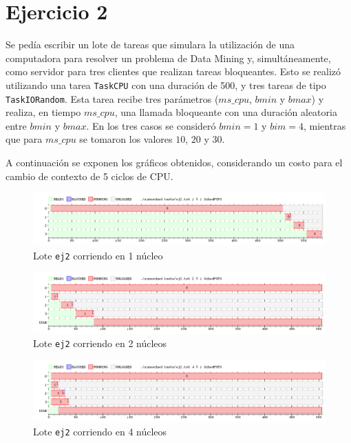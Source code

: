 \section{Ejercicio 2}

Se pedía escribir un lote de tareas que simulara la utilización de una
computadora para resolver un problema de Data Mining y, simultáneamente, como
servidor para tres clientes que realizan tareas bloqueantes. Esto se realizó
utilizando una tarea \texttt{TaskCPU} con una duración de 500, y tres tareas de
tipo \texttt{TaskIORandom}. Esta tarea recibe tres parámetros ($ms\_cpu$, $bmin$
y $bmax$) y realiza, en tiempo $ms\_cpu$, una llamada bloqueante con una duración
aleatoria entre $bmin$ y $bmax$. En los tres casos se consideró $bmin = 1$ y
$bim = 4$, mientras que para $ms\_cpu$ se tomaron los valores $10$, $20$ y $30$.

A continuación se exponen los gráficos obtenidos, considerando un costo para el cambio de contexto de 5 ciclos de CPU.

\begin{figure}[H]
    \begin{center}
        \includegraphics[width=1\columnwidth]{imagenes/ej2_1.png}
        \caption{Lote \texttt{ej2} corriendo en 1 núcleo}
    \end{center}
\end{figure}

\begin{figure}[H]
    \begin{center}
        \includegraphics[width=1\columnwidth]{imagenes/ej2_2.png}
        \caption{Lote \texttt{ej2} corriendo en 2 núcleos}
    \end{center}
\end{figure}

\begin{figure}[H]
    \begin{center}
        \includegraphics[width=1\columnwidth]{imagenes/ej2_3.png}
        \caption{Lote \texttt{ej2} corriendo en 4 núcleos}
    \end{center}
\end{figure}


